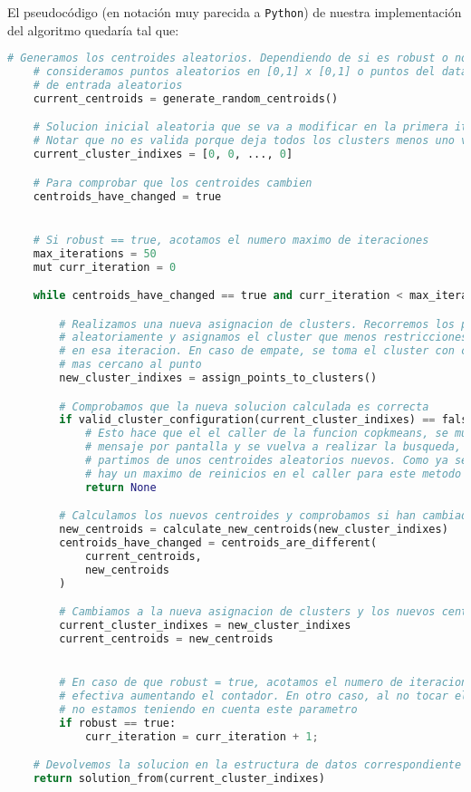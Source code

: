 \documentclass[11pt]{article}
\begin{document}
    El pseudocódigo (en notación muy parecida a \lstinline{Python}) de nuestra implementación del algoritmo quedaría tal que:

    \begin{lstlisting}[language=Python, style=Boxed]
    # Generamos los centroides aleatorios. Dependiendo de si es robust o no
    # consideramos puntos aleatorios en [0,1] x [0,1] o puntos del dataset
    # de entrada aleatorios
    current_centroids = generate_random_centroids()

    # Solucion inicial aleatoria que se va a modificar en la primera iteracion
    # Notar que no es valida porque deja todos los clusters menos uno vacíos
    current_cluster_indixes = [0, 0, ..., 0]

    # Para comprobar que los centroides cambien
    centroids_have_changed = true


    # Si robust == true, acotamos el numero maximo de iteraciones
    max_iterations = 50
    mut curr_iteration = 0

    while centroids_have_changed == true and curr_iteration < max_iterations{

        # Realizamos una nueva asignacion de clusters. Recorremos los puntos
        # aleatoriamente y asignamos el cluster que menos restricciones viole
        # en esa iteracion. En caso de empate, se toma el cluster con centroide
        # mas cercano al punto
        new_cluster_indixes = assign_points_to_clusters()

        # Comprobamos que la nueva solucion calculada es correcta
        if valid_cluster_configuration(current_cluster_indixes) == false:
            # Esto hace que el el caller de la funcion copkmeans, se muestre un
            # mensaje por pantalla y se vuelva a realizar la busqueda, con lo que
            # partimos de unos centroides aleatorios nuevos. Como ya se ha comentado,
            # hay un maximo de reinicios en el caller para este metodo
            return None

        # Calculamos los nuevos centroides y comprobamos si han cambiado
        new_centroids = calculate_new_centroids(new_cluster_indixes)
        centroids_have_changed = centroids_are_different(
            current_centroids,
            new_centroids
        )

        # Cambiamos a la nueva asignacion de clusters y los nuevos centroides
        current_cluster_indixes = new_cluster_indixes
        current_centroids = new_centroids


        # En caso de que robust = true, acotamos el numero de iteraciones de forma
        # efectiva aumentando el contador. En otro caso, al no tocar el contador
        # no estamos teniendo en cuenta este parametro
        if robust == true:
            curr_iteration = curr_iteration + 1;

    # Devolvemos la solucion en la estructura de datos correspondiente
    return solution_from(current_cluster_indixes)
    \end{lstlisting}
\end{document}
